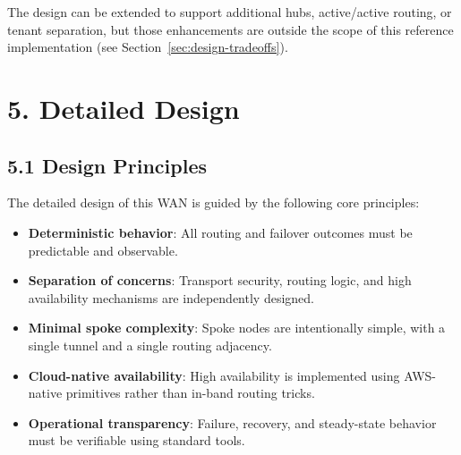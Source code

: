 \documentclass[11pt]{article}
\begin{document}
The design can be extended to support additional hubs, active/active routing, or tenant separation, but those enhancements are outside the scope of this reference implementation (see Section~\ref{sec:design-tradeoffs}).

%
%
%
\section{5. Detailed Design}
\label{sec:detailed-design}

\subsection{5.1 Design Principles}
\label{sec:design-principles}

The detailed design of this WAN is guided by the following core principles:

\begin{itemize}
  \item \textbf{Deterministic behavior}: All routing and failover outcomes must be predictable and observable.
  \item \textbf{Separation of concerns}: Transport security, routing logic, and high availability mechanisms are independently designed.
  \item \textbf{Minimal spoke complexity}: Spoke nodes are intentionally simple, with a single tunnel and a single routing adjacency.
  \item \textbf{Cloud-native availability}: High availability is implemented using AWS-native primitives rather than in-band routing tricks.
  \item \textbf{Operational transparency}: Failure, recovery, and steady-state behavior must be verifiable using standard tools.
\end{itemize}
\end{document}
